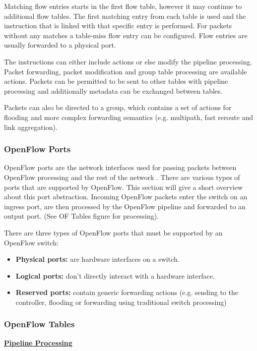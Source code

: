 Matching flow entries starts in the first flow table, however it may continue to additional flow tables. The first matching entry from each table is used and the instruction that is linked with that specific entry is performed. For packets without any matches a table-miss flow entry can be configured. Flow entries are usually forwarded to a physical port.

The instructions can either include actions or else modify the pipeline processing. Packet forwarding, packet modification and group table processing are available actions. Packets can be permitted to be sent to other tables with pipeline processing and additionally metadata can be exchanged between tables.

Packets can also be directed to a group, which contains a set of actions for flooding and more complex forwarding semantics (e.g. multipath, fast reroute and link aggregation).

\subsubsection{OpenFlow Ports}
OpenFlow ports are the network interfaces used for passing packets between OpenFlow processing and the rest of the network \cite{ofspecification}.
There are various types of ports that are supported by OpenFlow. This section will give a short overview about this port abstraction.
Incoming OpenFlow packets enter the switch on an ingress port, are then processed by the OpenFlow pipeline and forwarded to an output port. (See OF Tables figure for processing).

There are three types of OpenFlow ports that must be supported by an OpenFlow switch:
\begin{itemize}
\item \textbf{Physical ports:} are hardware interfaces on a switch.
\item \textbf{Logical ports:} don't directly interact  with a hardware interface.
\item \textbf{Reserved ports:} contain generic forwarding actions (e.g. sending to the controller, flooding or forwarding using traditional switch processing)
\end{itemize}

\subsubsection{OpenFlow Tables}

\textbf{\underline{Pipeline Processing}}

